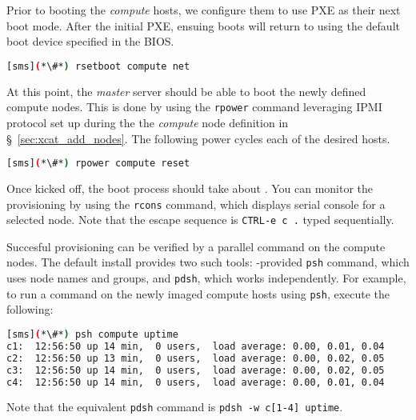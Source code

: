 Prior to booting the {\em compute} hosts, we configure them to use PXE as their
next boot mode. After the initial PXE, ensuing boots will return to using the default boot device
specified in the BIOS.

\begin{lstlisting}[language=bash,keywords={},upquote=true]
[sms](*\#*) rsetboot compute net
\end{lstlisting} 

At this point, the {\em master} server should be able to boot the newly defined
compute nodes. This is done by using the \texttt{rpower} \xCAT{} command
leveraging IPMI protocol set up during the the {\em compute} node definition
in \S~\ref{sec:xcat_add_nodes}. The following power cycles each of the
desired hosts.


\begin{lstlisting}[language=bash,keywords={},upquote=true]
[sms](*\#*) rpower compute reset
\end{lstlisting} 

Once kicked off, the boot process should take about .  You can monitor the
provisioning by using the \texttt{rcons} command, which displays serial console
for a selected node. Note that the escape sequence
is \texttt{CTRL-e c .} typed sequentially. 

Succesful provisioning can be verified by a parallel command on the compute
nodes. The default install provides two such tools: \xCAT{}-provided
\texttt{psh} command, which uses \xCAT{} node names and groups,
and \texttt{pdsh}, which works independently.  For example, to run a command on
the newly imaged compute hosts using \texttt{psh}, execute the following:

\begin{lstlisting}[language=bash]
[sms](*\#*) psh compute uptime
c1:  12:56:50 up 14 min,  0 users,  load average: 0.00, 0.01, 0.04
c2:  12:56:50 up 13 min,  0 users,  load average: 0.00, 0.02, 0.05
c3:  12:56:50 up 14 min,  0 users,  load average: 0.00, 0.02, 0.05
c4:  12:56:50 up 14 min,  0 users,  load average: 0.00, 0.01, 0.04
\end{lstlisting}
Note that the equivalent \texttt{pdsh} command is \texttt{pdsh -w c[1-4] uptime}. 
